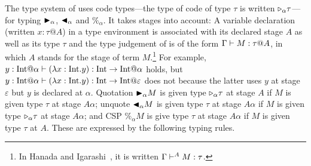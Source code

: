 The type system of \LTP uses code types---the type of code of type
\(\tau\) is written \({\mathop{\triangleright}}_\alpha \tau\)---for typing \({\mathop{\blacktriangleright}}_\alpha\),
\({\mathop{\blacktriangleleft}}_\alpha\) and \(\%_\alpha\).  It takes stages into account: A
variable declaration (written $x:\tau@A$) in a type environment is associated with its
declared stage $A$ as well as its type $\tau$ and the type judgement of \LTP is of
the form $\G \vdash M : \tau@A$, in which $A$ stands for the stage
of term $M$.\footnote{%
  In Hanada and Igarashi~\cite{Hanada2014}, it is written
  $\Gamma \vdash^A M : \tau$.
  }
For example,
$y:\I@\alpha \vdash (\lambda x:\I.y) : \I \to \I @ \alpha$ holds, but
$y:\I@\alpha \vdash (\lambda x:\I.y) : \I \to \I @ \varepsilon$ does
not because the latter uses $y$ at stage \(\varepsilon\) but $y$ is
declared at $\alpha$.  Quotation \({\mathop{\blacktriangleright}}_\alpha M\) is given type
\({\mathop{\triangleright}}_\alpha \tau\) at stage \(A\) if \(M\) is given type \(\tau\) at
stage \(A\alpha\); unquote \({\mathop{\blacktriangleleft}}_\alpha M\) is given type \(\tau\)
at stage \(A\alpha\) if \(M\) is given type \({\mathop{\triangleright}}_\alpha \tau\) at
stage \(A\alpha\); and CSP \(\%_\alpha M\) is give type \(\tau\)
at stage \(A\alpha\) if \(M\) is given type \(\tau\) at \(A\).
These are expressed by the following typing rules.
\begin{center}
	 \hfil
	 \hfil
\end{center}






